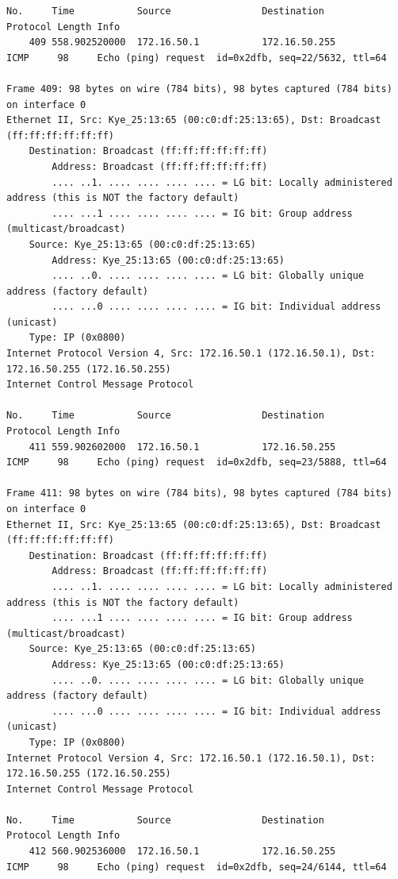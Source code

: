 \documentclass[a4paper,11pt]{article}
\begin{document}
\begin{lstlisting}
No.     Time           Source                Destination           Protocol Length Info
    409 558.902520000  172.16.50.1           172.16.50.255         ICMP     98     Echo (ping) request  id=0x2dfb, seq=22/5632, ttl=64

Frame 409: 98 bytes on wire (784 bits), 98 bytes captured (784 bits) on interface 0
Ethernet II, Src: Kye_25:13:65 (00:c0:df:25:13:65), Dst: Broadcast (ff:ff:ff:ff:ff:ff)
    Destination: Broadcast (ff:ff:ff:ff:ff:ff)
        Address: Broadcast (ff:ff:ff:ff:ff:ff)
        .... ..1. .... .... .... .... = LG bit: Locally administered address (this is NOT the factory default)
        .... ...1 .... .... .... .... = IG bit: Group address (multicast/broadcast)
    Source: Kye_25:13:65 (00:c0:df:25:13:65)
        Address: Kye_25:13:65 (00:c0:df:25:13:65)
        .... ..0. .... .... .... .... = LG bit: Globally unique address (factory default)
        .... ...0 .... .... .... .... = IG bit: Individual address (unicast)
    Type: IP (0x0800)
Internet Protocol Version 4, Src: 172.16.50.1 (172.16.50.1), Dst: 172.16.50.255 (172.16.50.255)
Internet Control Message Protocol

No.     Time           Source                Destination           Protocol Length Info
    411 559.902602000  172.16.50.1           172.16.50.255         ICMP     98     Echo (ping) request  id=0x2dfb, seq=23/5888, ttl=64

Frame 411: 98 bytes on wire (784 bits), 98 bytes captured (784 bits) on interface 0
Ethernet II, Src: Kye_25:13:65 (00:c0:df:25:13:65), Dst: Broadcast (ff:ff:ff:ff:ff:ff)
    Destination: Broadcast (ff:ff:ff:ff:ff:ff)
        Address: Broadcast (ff:ff:ff:ff:ff:ff)
        .... ..1. .... .... .... .... = LG bit: Locally administered address (this is NOT the factory default)
        .... ...1 .... .... .... .... = IG bit: Group address (multicast/broadcast)
    Source: Kye_25:13:65 (00:c0:df:25:13:65)
        Address: Kye_25:13:65 (00:c0:df:25:13:65)
        .... ..0. .... .... .... .... = LG bit: Globally unique address (factory default)
        .... ...0 .... .... .... .... = IG bit: Individual address (unicast)
    Type: IP (0x0800)
Internet Protocol Version 4, Src: 172.16.50.1 (172.16.50.1), Dst: 172.16.50.255 (172.16.50.255)
Internet Control Message Protocol

No.     Time           Source                Destination           Protocol Length Info
    412 560.902536000  172.16.50.1           172.16.50.255         ICMP     98     Echo (ping) request  id=0x2dfb, seq=24/6144, ttl=64


\end{lstlisting}
\end{document}
